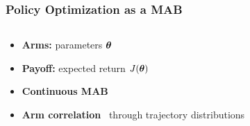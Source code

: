 \documentclass[aspectratio=169, table]{beamer}
\newcommand{\enb}[1]{\textcolor{poliblue1}{\textbf{#1}}}
\newcommand{\eno}[1]{\textcolor{orangep}{\textbf{#1}}}
\begin{document}
\begin{frame} 
\frametitle{Policy Optimization as a MAB } 
\begin{columns}
\begin{column}{.65\textwidth}
\begin{overlayarea}{\textwidth}{.75\textheight}
\begin{itemize}
	\setlength{\itemsep}{20pt}
	\item<1-> \enb{Arms:} parameters $\boldsymbol{\theta}$\vfill
	\item<2-> \enb{Payoff:} expected return $J(\boldsymbol{\theta})$\vfill
	\item<3-> \eno{Continuous MAB}~\citep{kleinberg2013bandits}\vfill
	\item<4-> {\enb{Arm correlation}~\citep{pandey2007multi} through trajectory distributions}\vfill
\end{itemize}
\end{overlayarea}
\end{column}
\begin{column}{.65\textwidth}
\begin{overlayarea}{\textwidth}{\textheight}
\end{overlayarea}
\end{column}
\end{columns}
\end{frame}
\end{document}
